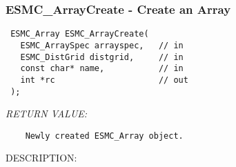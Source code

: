  
\setlength{\oldparskip}{\parskip}
\setlength{\parskip}{1.5ex}
\setlength{\oldparindent}{\parindent}
\setlength{\parindent}{0pt}
\setlength{\oldbaselineskip}{\baselineskip}
\setlength{\baselineskip}{11pt}
 
\def\bv{\begin{verbatim}}
\def\ev{\end{verbatim}}
\def\be{\begin{equation}}
\def\ee{\end{equation}}
\def\bea{\begin{eqnarray}}
\def\eea{\end{eqnarray}}
\def\bi{\begin{itemize}}
\def\ei{\end{itemize}}
\def\bn{\begin{enumerate}}
\def\en{\end{enumerate}}
\def\bd{\begin{description}}
\def\ed{\end{description}}
\def\({\left (}
\def\){\right )}
\def\[{\left [}
\def\]{\right ]}
\def\<{\left  \langle}
\def\>{\right \rangle}
\def\cI{{\cal I}}
\def\diag{\mathop{\rm diag}}
\def\tr{\mathop{\rm tr}}


 
\subsubsection [ESMC\_ArrayCreate] {ESMC\_ArrayCreate - Create an Array}


  
\begin{verbatim} ESMC_Array ESMC_ArrayCreate(
   ESMC_ArraySpec arrayspec,   // in
   ESMC_DistGrid distgrid,     // in
   const char* name,           // in
   int *rc                     // out
 );\end{verbatim}{\em RETURN VALUE:}
\begin{verbatim}    Newly created ESMC_Array object.\end{verbatim}
{\sf DESCRIPTION:\\ }


